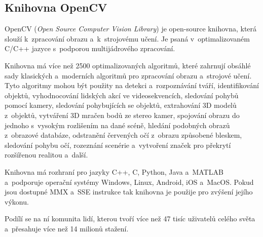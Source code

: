 \subsection{Knihovna OpenCV}
OpenCV (\textit{Open Source Computer Vision Library}) je open-source knihovna, která slouží k~zpracování obrazu a~k~strojovému učení. Je psaná v~optimalizovaném C/C++ jazyce s~podporou multijádrového zpracování.

Knihovna má více než 2500 optimalizovaných algoritmů, které zahrnují obsáhlé sady klasických a~moderních algoritmů pro zpracování obrazu a~strojové učení. Tyto algoritmy mohou být použity na detekci a~rozpoznávání tváří, identifikování objektů, vyhodnocování lidských akcí ve videosekvencích, sledování pohybů pomocí kamery, sledování pohybujících se objektů, extrahování 3D modelů z~objektů, vytváření 3D mračen bodů ze stereo kamer, spojování obrazu do jednoho s~vysokým rozlišením na dané scéně, hledání podobných obrazů z~obrazové databáze, odstranění červených očí z~obrazu způsobené bleskem, sledování pohybu očí, rozeznání scenérie a~vytvoření značek pro překrytí rozšířenou realitou a~další.

Knihovna má rozhraní pro jazyky C++, C, Python, Java a~MATLAB a~podporuje operační systémy Windows, Linux, Android, iOS a~MacOS. 
Pokud jsou dostupné MMX a~SSE instrukce tak knihovna je použije pro zvýšení jejího výkonu.

Podílí se na ní komunita lidí, kterou tvoří více než 47 tisíc uživatelů celého světa a~přesahuje více než 14 milionů stažení. 


